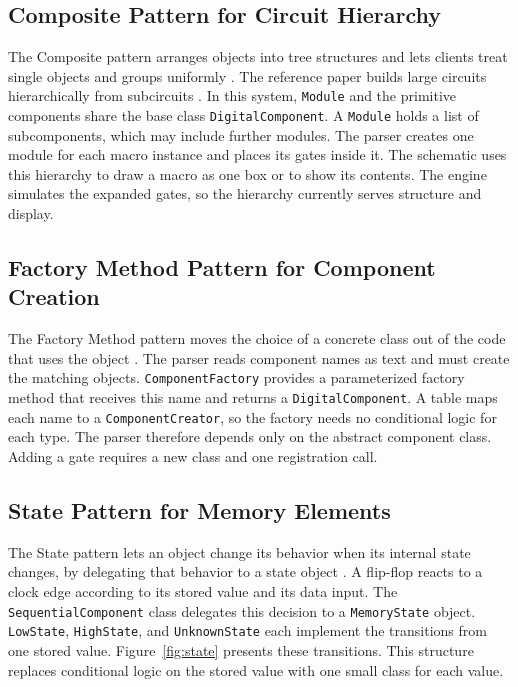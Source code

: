 \subsection{Composite Pattern for Circuit Hierarchy}

The Composite pattern arranges objects into tree structures and lets clients treat single objects and groups uniformly .
The reference paper builds large circuits hierarchically from subcircuits .
In this system, \texttt{Module} and the primitive components share the base class \texttt{DigitalComponent}.
A \texttt{Module} holds a list of subcomponents, which may include further modules.
The parser creates one module for each macro instance and places its gates inside it.
The schematic uses this hierarchy to draw a macro as one box or to show its contents.
The engine simulates the expanded gates, so the hierarchy currently serves structure and display.

\subsection{Factory Method Pattern for Component Creation}

The Factory Method pattern moves the choice of a concrete class out of the code that uses the object .
The parser reads component names as text and must create the matching objects.
\texttt{ComponentFactory} provides a parameterized factory method that receives this name and returns a \texttt{DigitalComponent}.
A table maps each name to a \texttt{ComponentCreator}, so the factory needs no conditional logic for each type.
The parser therefore depends only on the abstract component class.
Adding a gate requires a new class and one registration call.

\subsection{State Pattern for Memory Elements}

The State pattern lets an object change its behavior when its internal state changes, by delegating that behavior to a state object .
A flip-flop reacts to a clock edge according to its stored value and its data input.
The \texttt{SequentialComponent} class delegates this decision to a \texttt{MemoryState} object.
\texttt{LowState}, \texttt{HighState}, and \texttt{UnknownState} each implement the transitions from one stored value.
Figure~\ref{fig:state} presents these transitions.
This structure replaces conditional logic on the stored value with one small class for each value.

